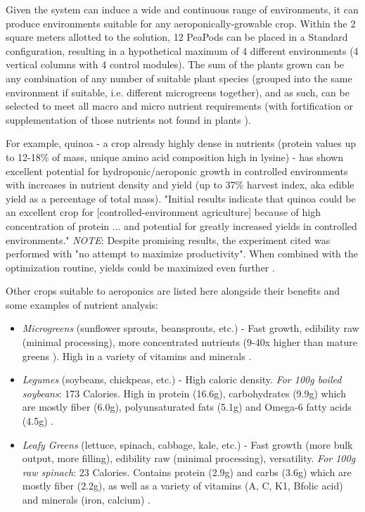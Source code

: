 \documentclass{report}
\begin{document}

Given the system can induce a wide and continuous range of environments, it can produce environments suitable for any aeroponically-growable crop. Within the 2 square meters allotted to the solution, 12 PeaPods can be placed in a Standard configuration, resulting in a hypothetical maximum of 4 different environments (4 vertical columns with 4 control modules). The sum of the plants grown can be any combination of any number of suitable plant species (grouped into the same environment if suitable, i.e. different microgreens together), and as such, can be selected to meet all macro and micro nutrient requirements (with fortification or supplementation of those nutrients not found in plants \cite{plantbased}). 

For example, quinoa - a crop already highly dense in nutrients (protein values up to 12-18\% of mass, unique amino acid composition high in lysine) - has shown excellent potential for hydroponic/aeroponic growth in controlled environments with increases in nutrient density and yield (up to 37\% harvest index, aka edible yield as a percentage of total mass). "Initial results indicate that quinoa could be an excellent crop for [controlled-environment agriculture] because of high concentration of protein ... and potential for greatly increased yields in controlled environments." \textit{NOTE}: Despite promising results, the experiment cited was performed with "no attempt to maximize productivity". When combined with the optimization routine, yields could be maximized even further \cite{quinoa}.

Other crops suitable to aeroponics are listed here alongside their benefits and some examples of nutrient analysis:
\begin{itemize}
    \item \textit{Microgreens} (sunflower sprouts, beansprouts, etc.) - Fast growth, edibility raw (minimal processing), more concentrated nutrients (9-40x higher than mature greens \cite{microgreens2}). High in a variety of vitamins and minerals \cite{microgreens1}.
    \item \textit{Legumes} (soybeans, chickpeas, etc.) - High caloric density. \textit{For 100g boiled soybeans}: 173 Calories. High in protein (16.6g), carbohydrates (9.9g) which are mostly fiber (6.0g), polyunsaturated fats (5.1g) and Omega-6 fatty acids (4.5g) \cite{soybeans}.
    \item \textit{Leafy Greens} (lettuce, spinach, cabbage, kale, etc.) - Fast growth (more bulk output, more filling), edibility raw (minimal processing), versatility. \textit{For 100g raw spinach}: 23 Calories. Contains protein (2.9g) and carbs (3.6g) which are mostly fiber (2.2g), as well as a variety of vitamins (A, C, K1, Bfolic acid) and minerals (iron, calcium) \cite{spinach}. 
\end{itemize}
\end{document}
